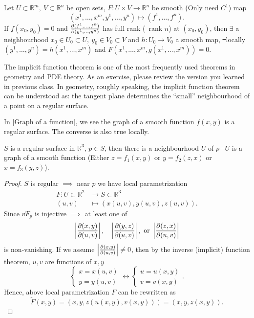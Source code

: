 \begin{theorem}
    Let \(U\subset \mathbb{R}^m,\ V\subset \mathbb{R}^n\) be open sets,
    \(F\colon U\times V\to \mathbb{R}^n\) be smooth (Only need \(C^1\)) map \[
        (x^1,\ldots,x^m,y^1,\ldots,y^n)\mapsto (f^1,\ldots,f^n)
    .\] If \(f(x_0,y_0)=0\) and \(\pdv{(f^1,\ldots,f^n)}{(y^1,\ldots,y^n)}\)
    has full rank (\ie\ rank \(n\)) at \((x_0,y_0)\), then \(\exists\) a
    neighbourhood \(x_0\in U_0\subset U,\ y_0\in V_0\subset V\) and \(h\colon U_0
    \to V_0\) a smooth map, \st\ locally \((y^1,\ldots,y^n)=h(x^1,\ldots,x^m)\) and 
    \(F(x^1,\ldots,x^m,g(x^1,\ldots,x^m))=0\).
\end{theorem}

\begin{remark}
    The implicit function theorem is one of the most frequently used theorems
    in geometry and PDE theory. As an exercise, please review the version you learned
    in previous class. In geometry, roughly speaking, the implicit function theorem
    can be understood as: the tangent plane determines the ``small'' neighbourhood
    of a point on a regular surface.
\end{remark}

In \cref{Graph of a function}, we see the graph of a smooth function \(f(x,y)\) is a regular
surface. The converse is also true locally.
\begin{prop}
    \(S\) is a regular surface in \(\mathbb{R}^3\), \(p\in S\), then there is a
    neighbourhood \(U\) of \(p\) \st\ \(U\) is a graph of a smooth function
    (Either \(z=f_1(x,y)\) or \(y=f_2(z,x)\) or \(x=f_3(y,z)\)).
\end{prop}
\begin{proof}
    \(S\) is regular \(\implies \) near \(p\) we have local parametrization
    \begin{align*}
        F\colon U\subset \mathbb{R}^2 &\longrightarrow S\subset \mathbb{R}^3 \\
        (u,v) &\longmapsto (x(u,v),y(u,v),z(u,v))
    .\end{align*}
    Since \(\dd{F_p}\) is injective \(\implies \) at least one of \[
        \left|\pdv{(x,y)}{(u,v)}\right|,\quad
        \left|\pdv{(y,z)}{(u,v)}\right|,\ 
        \text{or }\left|\pdv{(z,x)}{(u,v)}\right|
    \] is non-vanishing.
    If we assume \(\left|\pdv{(x,y)}{(u,v)}\right|\neq 0\), then by the inverse
    (implicit) function theorem, \(u,v\) are functions of \(x,y\) \ie\ \[
        \begin{cases}
            x=x(u,v) \\
            y=y(u,v)
        \end{cases}\longleftrightarrow
        \begin{cases}
            u=u(x,y) \\
            v=v(x,y)
        \end{cases}
    .\] Hence, above local parametrization \(F\) can be rewritten as \[
        \tilde{F}(x,y)=(x,y,z(u(x,y),v(x,y)))=(x,y,z(x,y)).
    \] 
\end{proof}

